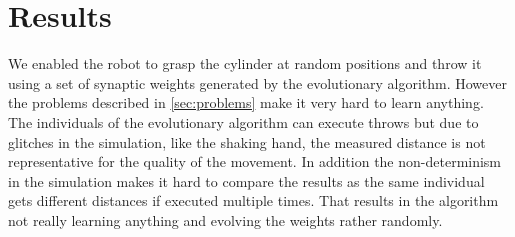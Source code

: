 \section{Results}
We enabled the robot to grasp the cylinder at random positions and throw it using a set of synaptic weights generated by the evolutionary algorithm.
However the problems described in \autoref{sec:problems} make it very hard to learn anything.
The individuals of the evolutionary algorithm can execute throws but due to glitches in the simulation, like the shaking hand, the measured distance is not representative for the quality of the movement.
In addition the non-determinism in the simulation makes it hard to compare the results as the same individual gets different distances if executed multiple times.
That results in the algorithm not really learning anything and evolving the weights rather randomly.